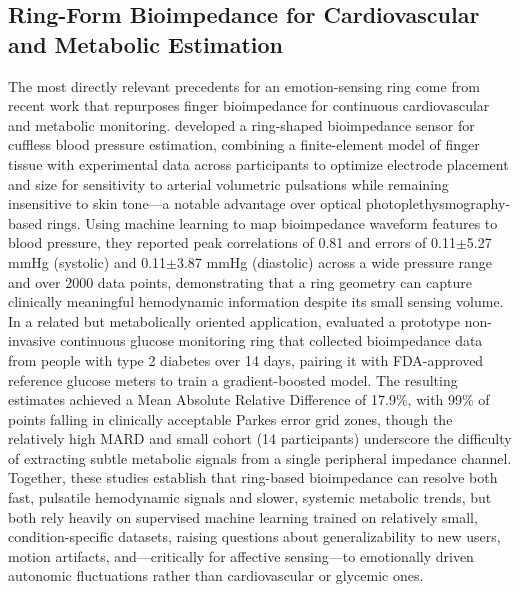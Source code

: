 \subsection{Ring-Form Bioimpedance for Cardiovascular and Metabolic Estimation}
The most directly relevant precedents for an emotion-sensing ring come from recent work that repurposes finger bioimpedance for continuous cardiovascular and metabolic monitoring. \cite{sel2023continuous} developed a ring-shaped bioimpedance sensor for cuffless blood pressure estimation, combining a finite-element model of finger tissue with experimental data across participants to optimize electrode placement and size for sensitivity to arterial volumetric pulsations while remaining insensitive to skin tone---a notable advantage over optical photoplethysmography-based rings. Using machine learning to map bioimpedance waveform features to blood pressure, they reported peak correlations of 0.81 and errors of 0.11$\pm$5.27 mmHg (systolic) and 0.11$\pm$3.87 mmHg (diastolic) across a wide pressure range and over 2000 data points, demonstrating that a ring geometry can capture clinically meaningful hemodynamic information despite its small sensing volume. In a related but metabolically oriented application, \cite{sanai2021evaluation} evaluated a prototype non-invasive continuous glucose monitoring ring that collected bioimpedance data from people with type 2 diabetes over 14 days, pairing it with FDA-approved reference glucose meters to train a gradient-boosted model. The resulting estimates achieved a Mean Absolute Relative Difference of 17.9\%, with 99\% of points falling in clinically acceptable Parkes error grid zones, though the relatively high MARD and small cohort (14 participants) underscore the difficulty of extracting subtle metabolic signals from a single peripheral impedance channel. Together, these studies establish that ring-based bioimpedance can resolve both fast, pulsatile hemodynamic signals and slower, systemic metabolic trends, but both rely heavily on supervised machine learning trained on relatively small, condition-specific datasets, raising questions about generalizability to new users, motion artifacts, and---critically for affective sensing---to emotionally driven autonomic fluctuations rather than cardiovascular or glycemic ones.


